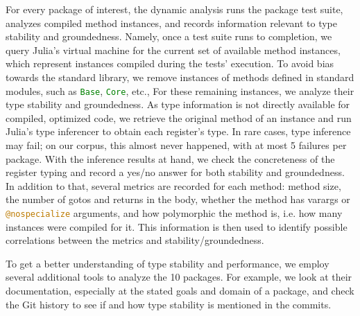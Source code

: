 \documentclass[oneside,openright,titlepage,numbers=noenddot,%
headinclude,footinclude,cleardoublepage=empty,abstract=on,
BCOR=5mm,paper=a4,fontsize=11pt,
dvipsnames
]{scrreprt}
\renewcommand{\c}[1]{\lstinline[language=Julia]!#1!\xspace}
\begin{document}
For every package of interest, the dynamic analysis runs the package test suite,
analyzes compiled method instances, and records information relevant to
type stability and groundedness. Namely, once a test suite runs to completion,
we query Julia's virtual machine for the current set of available method
instances, which represent instances compiled during the tests' execution. To
avoid bias towards the standard library, we remove instances of methods defined in
standard modules, such as \c{Base}, \c{Core}, etc., 
For these remaining instances,
we analyze their type stability and groundedness. As type information is not
directly available for compiled, optimized code, we retrieve the original method
of an instance and run Julia's type inferencer to obtain each register's type.
In rare cases, type inference may fail;
on our corpus, this almost never happened, with at most 5 failures per package.
With the inference results at hand, we check the concreteness of the register
typing and record a yes/no answer for both stability and groundedness. In
addition to that, several metrics are recorded for each method:
method size, the number of gotos and returns in the body, whether the method has
varargs or \c{@nospecialize} arguments, and
how polymorphic the method is, i.e. how many instances were compiled for it.
This information is then used to identify possible correlations between the
metrics and stability/groundedness.

To get a better understanding of type stability and performance, we employ
several additional tools to analyze the 10 packages. For example, we look at
their documentation, especially at the stated goals and domain of a package, and
check the Git history to see if and how type stability is mentioned in the
commits.

\end{document}
